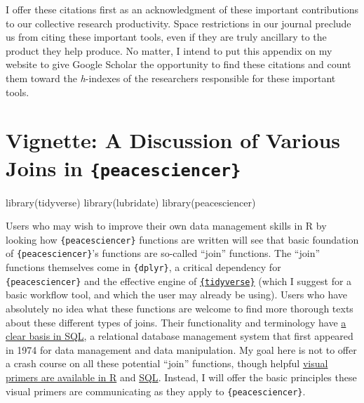 \documentclass[
  11pt,
]{article}
\newenvironment{Shaded}{\begin{snugshade}}{\end{snugshade}}
\newcommand{\FunctionTok}[1]{\textcolor[rgb]{0.00,0.00,0.00}{#1}}
\newcommand{\NormalTok}[1]{#1}
\begin{document}
I offer these citations first as an acknowledgment of these important contributions to our collective research productivity. Space restrictions in our journal preclude us from citing these important tools, even if they are truly ancillary to the product they help produce. No matter, I intend to put this appendix on my website to give Google Scholar the opportunity to find these citations and count them toward the \emph{h}-indexes of the researchers responsible for these important tools.

\hypertarget{vignette-a-discussion-of-various-joins-in-peacesciencer}{%
\section{\texorpdfstring{Vignette: A Discussion of Various Joins in \texttt{\{peacesciencer\}}}{Vignette: A Discussion of Various Joins in \{peacesciencer\}}}\label{vignette-a-discussion-of-various-joins-in-peacesciencer}}

\begin{Shaded}
\begin{Highlighting}[]
\FunctionTok{library}\NormalTok{(tidyverse)}
\FunctionTok{library}\NormalTok{(lubridate)}
\FunctionTok{library}\NormalTok{(peacesciencer)}
\end{Highlighting}
\end{Shaded}

Users who may wish to improve their own data management skills in R by looking how \texttt{\{peacesciencer\}} functions are written will see that basic foundation of \texttt{\{peacesciencer\}}'s functions are so-called ``join'' functions. The ``join'' functions themselves come in \texttt{\{dplyr\}}, a critical dependency for \texttt{\{peacesciencer\}} and the effective engine of \href{https://www.tidyverse.org}{\texttt{\{tidyverse\}}} (which I suggest for a basic workflow tool, and which the user may already be using). Users who have absolutely no idea what these functions are welcome to find more thorough texts about these different types of joins. Their functionality and terminology have \href{https://www.w3schools.com/sql/sql_join.asp}{a clear basis in SQL}, a relational database management system that first appeared in 1974 for data management and data manipulation. My goal here is not to offer a crash course on all these potential ``join'' functions, though helpful \href{https://github.com/gadenbuie/tidyexplain}{visual primers are available in R} and \href{https://blog.codinghorror.com/a-visual-explanation-of-sql-joins/}{SQL}. Instead, I will offer the basic principles these visual primers are communicating as they apply to \texttt{\{peacesciencer\}}.
\end{document}
